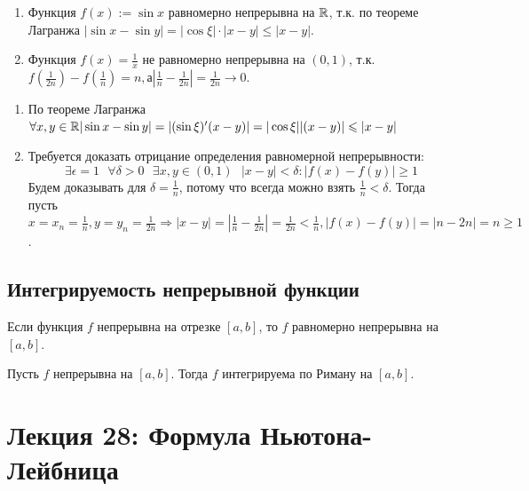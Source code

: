     \begin{example}
    	\begin{enumerate}
    		\item Функция $f(x) := \sin{x}$ равномерно непрерывна на $\mathbb R$, т.к.
    		по теореме Лагранжа $|\sin{x} - \sin{y}| = |\cos{\xi}| \cdot |x - y| \leqslant |x - y|$.
    		\item Функция $f(x) = \frac{1}{x}$ не равномерно непрерывна на $(0, 1)$,
    		т.к. $f(\frac{1}{2n}) - f(\frac{1}{n}) = n, а |\frac{1}{n} - \frac{1}{2n}| = \frac{1}{2n} \rightarrow 0$.
    	\end{enumerate}
    \end{example}
    
    \begin{explanation}
    	\begin{enumerate}
    		\item По теореме Лагранжа $\forall x, y \in \mathbb R |\sin{x} - \sin{y}| = |(\sin{\xi})'(x - y)| = |\cos{\xi}||(x - y)| \leqslant |x - y|$
    		\item Требуется доказать отрицание определения равномерной непрерывности:
    		\[ \exists \epsilon = 1 \text{ } \forall \delta > 0 \text{ } \exists x, y \in (0, 1) \text{ } |x - y| < \delta: |f(x) - f(y)| \geqslant 1 \]
    		Будем доказывать для $\delta = \frac{1}{n}$, потому что всегда можно взять $\frac{1}{n} < \delta$. Тогда пусть $x = x_n = \frac{1}{n}, y = y_n = \frac{1}{2n} \Rightarrow |x - y| = |\frac{1}{n} - \frac{1}{2n}| = \frac{1}{2n} < \frac{1}{n}, |f(x) - f(y)| = |n - 2n| = n \geqslant 1$.
    	\end{enumerate}
    \end{explanation}
    
    \subsection{Интегрируемость непрерывной функции}
    
    \begin{theorem}[Кантора]
    	Если функция $f$ непрерывна на отрезке $[a, b]$, то $f$ равномерно непрерывна на $[a, b]$.
    \end{theorem}
    
    \begin{corollary}
    	Пусть $f$ непрерывна на $[a, b]$. Тогда $f$ интегрируема по Риману на $[a, b]$.
    \end{corollary}
    
    \newpage
    
    \section{Лекция 28: Формула Ньютона-Лейбница}
    
